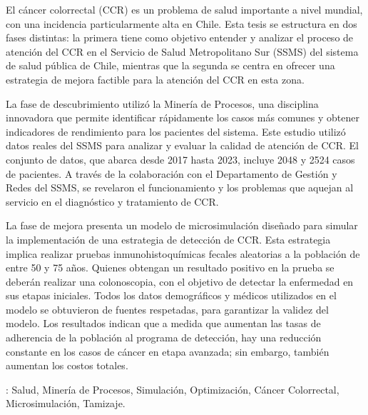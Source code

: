 El cáncer colorrectal (CCR) es un problema de salud importante a nivel mundial, con una incidencia particularmente alta en Chile. Esta tesis se estructura en dos fases distintas: la primera tiene como objetivo entender y analizar el proceso de atención del CCR en el Servicio de Salud Metropolitano Sur (SSMS) del sistema de salud pública de Chile, mientras que la segunda se centra en ofrecer una estrategia de mejora factible para la atención del CCR en esta zona.

La fase de descubrimiento utilizó la Minería de Procesos, una disciplina innovadora que permite identificar rápidamente los casos más comunes y obtener indicadores de rendimiento para los pacientes del sistema. Este estudio utilizó datos reales del SSMS para analizar y evaluar la calidad de atención de CCR. El conjunto de datos, que abarca desde 2017 hasta 2023, incluye 2048 y 2524 casos de pacientes. A través de la colaboración con el Departamento de Gestión y Redes del SSMS, se revelaron el funcionamiento y los problemas que aquejan al servicio en el diagnóstico y tratamiento de CCR.

La fase de mejora presenta un modelo de microsimulación diseñado para simular la implementación de una estrategia de detección de CCR. Esta estrategia implica realizar pruebas inmunohistoquímicas fecales aleatorias a la población de entre 50 y 75 años. Quienes obtengan un resultado positivo en la prueba se deberán realizar una colonoscopia, con el objetivo de detectar la enfermedad en sus etapas iniciales. Todos los datos demográficos y médicos utilizados en el modelo se obtuvieron de fuentes respetadas, para garantizar la validez del modelo. Los resultados indican que a medida que aumentan las tasas de adherencia de la población al programa de detección, hay una reducción constante en los casos de cáncer en etapa avanzada; sin embargo, también aumentan los costos totales.

\vfill
{}: Salud, Minería de Procesos, Simulación, Optimización, Cáncer Colorrectal, Microsimulación, Tamizaje.
